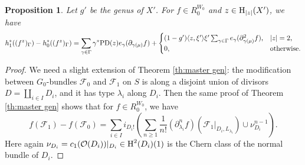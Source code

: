 \documentclass[reqno]{amsart}
\numberwithin{equation}{subsection}
\newtheorem{prop}[subsubsection]{Proposition}
\theoremstyle{definition}
\newcommand\cF{\mathcal{F}}
\newcommand\cO{\mathcal{O}}
\renewcommand{\j}[1]{\langle{#1}\rangle}
\newcommand{\homog}[2]{\textup{H}_{#1}({#2})}  %
\newcommand{\cohog}[2]{\textup{H}^{#1}({#2})}     %
\newcommand\g\gamma
\newcommand\G\Gamma
\renewcommand{\l}{\lambda}
\newcommand\PD{\textup{PD}}
\newcommand\pl{\partial}
\begin{document}
\begin{prop}\label{p:master eqn qs}
Let $g'$ be the genus of $X'$. For $f\in R_{0}^{W_{0}}$ and $z\in \homog{|z|}{X'}$, we have
\begin{equation*}
h_{1}^{*}((f^{z})_{\G})-h_{0}^{*}((f^{z})_{\G})=\sum_{\g\in \G}\g^{*}\PD(z)e_{\g}(\pl_{\g(\mu)}f)+\begin{cases}(1-g')\j{z,\xi'}\xi'\sum_{\g\in \G}e_{\g}(\pl^{2}_{\g(\mu)}f), & |z|=2,\\
0, & \mbox{otherwise.}
\end{cases}
\end{equation*}

\end{prop}
\begin{proof}
We need a slight extension of Theorem \ref{th:master gen}: the modification between $G_{0}$-bundles $\cF_{0}$ and $\cF_{1}$ on $S$ is along a disjoint union of divisors $D=\coprod_{i\in I} D_{i}$, and it has type $\l_{i}$ along $D_{i}$. Then the same proof of Theorem \ref{th:master gen} shows that for $f\in R_{0}^{W_{0}}$, we have
\begin{equation}\label{diff Chern qs}
f(\cF_{1})-f(\cF_{0})=\sum_{i\in I}i_{D_{i}!}\left(\sum_{n\ge1}\frac{1}{n!}(\pl^{n}_{\l_{i}}f)(\cF_{1}|_{D_{i}, L_{\l_{i}}})\cup \nu_{D_{i}}^{n-1}\right).
\end{equation}
Here again $\nu_{D_{i}}=c_{1}(\cO(D_{i}))|_{D_{i}}\in \cohog{2}{D_{i}}(1)$ is the Chern class of the normal bundle of $D_{i}$.


\end{proof}
\end{document}
